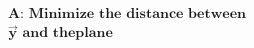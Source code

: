 \documentclass[preview]{standalone}
\begin{document}
\begin{align*}
\textbf{A:} \,\, \textbf{Minimize} \,\, \textbf{the distance between} \\ \mathbf{\vec{y}} \,\, \textbf{and the} \textbf{plane}
\end{align*}
\end{document}

